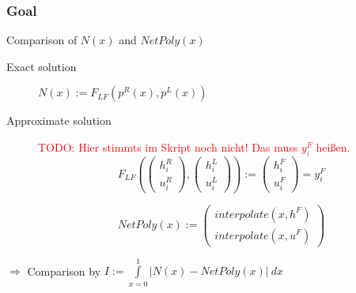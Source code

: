 \documentclass{beamer}
\newcommand{\todo}[1]{\textcolor{red}{TODO: #1}}
\begin{document}
\begin{frame}
  \frametitle{Goal}
  \begin{block}{Comparison of $N(x)$ and $NetPoly(x)$}
    \begin{description}
    \item[Exact solution] $N(x) := F_{LF}(p^R(x),p^L(x))$
    \item[Approximate solution] \todo{Hier stimmts im Skript noch nicht! Das muss $y_i^F$ heißen.}
      \begin{equation*}
        F_{LF}\left(
          \begin{pmatrix}
            h_i^R \\ u_i^R
          \end{pmatrix},
          \begin{pmatrix}
            h_i^L \\ u_i^L
          \end{pmatrix}
        \right) :=
        \begin{pmatrix}
          h_i^F \\ u_i^F
        \end{pmatrix} = y_i^F
      \end{equation*}

      \begin{equation*}
        NetPoly(x) :=
        \begin{pmatrix}
          interpolate(x,h^F) \\ interpolate(x,u^F)
        \end{pmatrix}
      \end{equation*}
    \end{description}
  \end{block}
  $\Rightarrow$ Comparison by 
  $I := \int\limits_{x=0}^1 | N(x) - NetPoly(x) |\  dx$

\end{frame}
\end{document}
